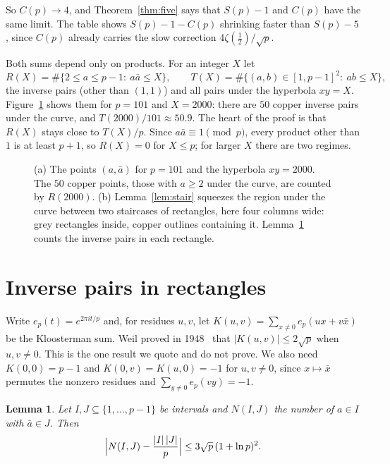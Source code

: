 \documentclass[11pt]{amsart}
\newtheorem{lemma}[theorem]{Lemma}
\theoremstyle{remark}
\begin{document}
So $C(p)\to4$, and Theorem~\ref{thm:five} says that $S(p)-1$ and $C(p)$ have the same limit. The table shows $S(p)-1-C(p)$ shrinking faster than $S(p)-5$, since $C(p)$ already carries the slow correction $4\zeta(\tfrac12)/\sqrt p$.

Both sums depend only on products. For an integer $X$ let
\[
R(X)=\#\{2\le a\le p-1:\ a\bar a\le X\},\qquad T(X)=\#\{(a,b)\in[1,p-1]^2:\ ab\le X\},
\]
the inverse pairs (other than $(1,1)$) and all pairs under the hyperbola $xy=X$. Figure~\ref{fig:pairs} shows them for $p=101$ and $X=2000$: there are $50$ copper inverse pairs under the curve, and $T(2000)/101\approx50.9$. The heart of the proof is that $R(X)$ stays close to $T(X)/p$. Since $a\bar a\equiv1\pmod p$, every product other than $1$ is at least $p+1$, so $R(X)=0$ for $X\le p$; for larger $X$ there are two regimes.

\begin{figure}[ht]
\centering
\begin{tikzpicture}
  
\end{tikzpicture}
\caption{(a) The points $(a,\bar a)$ for $p=101$ and the hyperbola $xy=2000$. The $50$ copper points, those with $a\ge2$ under the curve, are counted by $R(2000)$. (b) Lemma~\ref{lem:stair} squeezes the region under the curve between two staircases of rectangles, here four columns wide: grey rectangles inside, copper outlines containing it. Lemma~\ref{lem:box} counts the inverse pairs in each rectangle.}
\label{fig:pairs}
\end{figure}

\section{Inverse pairs in rectangles}

Write $e_p(t)=e^{2\pi it/p}$ and, for residues $u,v$, let $K(u,v)=\sum_{x\ne0}e_p(ux+v\bar x)$ be the Kloosterman sum. Weil proved in 1948~\cite{Weil} that $|K(u,v)|\le2\sqrt p$ when $u,v\ne0$. This is the one result we quote and do not prove. We also need $K(0,0)=p-1$ and $K(0,v)=K(u,0)=-1$ for $u,v\ne0$, since $x\mapsto\bar x$ permutes the nonzero residues and $\sum_{y\ne0}e_p(vy)=-1$.

\begin{lemma}\label{lem:box}
Let $I,J\subseteq\{1,\dots,p-1\}$ be intervals and $N(I,J)$ the number of $a\in I$ with $\bar a\in J$. Then
\[
\Bigl|N(I,J)-\frac{|I|\,|J|}p\Bigr|\le3\sqrt p\,(1+\ln p)^2 .
\]
\end{lemma}
\end{document}
